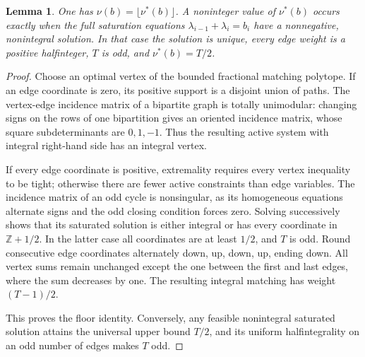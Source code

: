 \documentclass[11pt]{article}
\newtheorem{lemma}[theorem]{Lemma}
\theoremstyle{remark}
\newcommand{\ZZ}{\mathbb Z}
\begin{document}
\begin{lemma}\label{lem:cycle}
One has $\nu(b)=\lfloor\nu^*(b)\rfloor$. A noninteger value of
$\nu^*(b)$ occurs exactly when the full saturation equations
$\lambda_{i-1}+\lambda_i=b_i$ have a nonnegative, nonintegral solution.
In that case the solution is unique, every edge weight is a positive
halfinteger, $T$ is odd, and $\nu^*(b)=T/2$.
\end{lemma}
\begin{proof}
Choose an optimal vertex of the bounded fractional matching polytope.
If an edge coordinate is zero, its positive support is a disjoint union
of paths. The vertex-edge incidence matrix of a bipartite graph is
totally unimodular: changing signs on the rows of one bipartition gives
an oriented incidence matrix, whose square subdeterminants are
$0,1,-1$. Thus the resulting active system with integral right-hand
side has an integral vertex.

If every edge coordinate is positive, extremality requires every vertex
inequality to be tight; otherwise there are fewer active constraints
than edge variables. The incidence matrix of an odd cycle is
nonsingular, as its homogeneous equations alternate signs and the odd
closing condition forces zero. Solving successively shows that its
saturated solution is either integral or has every coordinate in
$\ZZ+1/2$. In the latter case all coordinates are at least $1/2$,
and $T$ is odd. Round consecutive edge coordinates alternately down,
up, down, up, ending down. All vertex sums remain unchanged except
the one between the first and last edges, where the sum decreases by
one. The resulting integral matching has weight $(T-1)/2$.

This proves the floor identity. Conversely, any feasible nonintegral
saturated solution attains the universal upper bound $T/2$, and its
uniform halfintegrality on an odd number of edges makes $T$ odd.
\end{proof}
\end{document}
